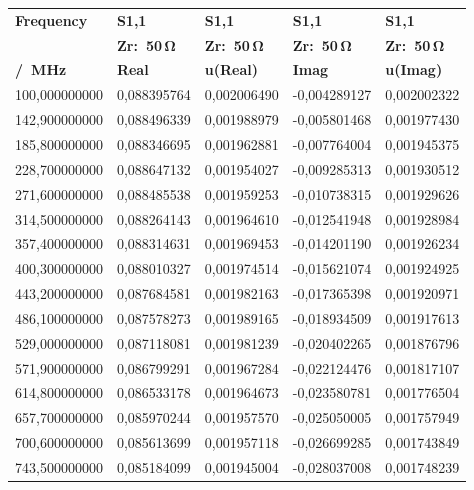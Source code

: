 \begin{longtable}{rrrrr}
\multicolumn{1}{l}{\textbf{Frequency}} & \multicolumn{1}{l}{\textbf{S1,1}} & \multicolumn{1}{l}{\textbf{S1,1}} & \multicolumn{1}{l}{\textbf{S1,1}} & \multicolumn{1}{l}{\textbf{S1,1}}\\
\multicolumn{1}{l}{\textbf{}} & \multicolumn{1}{l}{\textbf{Zr:~50\,$\mathbf{\Omega}$}} & \multicolumn{1}{l}{\textbf{Zr:~50\,$\mathbf{\Omega}$}} & \multicolumn{1}{l}{\textbf{Zr:~50\,$\mathbf{\Omega}$}} & \multicolumn{1}{l}{\textbf{Zr:~50\,$\mathbf{\Omega}$}}\\
\multicolumn{1}{l}{\textbf{/~MHz}} & \multicolumn{1}{l}{\textbf{Real}} & \multicolumn{1}{l}{\textbf{u(Real)}} & \multicolumn{1}{l}{\textbf{Imag}} & \multicolumn{1}{l}{\textbf{u(Imag)}}\\
\hline
\endhead
100,000000000 & 0,088395764 & 0,002006490 & -0,004289127 & 0,002002322\\
142,900000000 & 0,088496339 & 0,001988979 & -0,005801468 & 0,001977430\\
185,800000000 & 0,088346695 & 0,001962881 & -0,007764004 & 0,001945375\\
228,700000000 & 0,088647132 & 0,001954027 & -0,009285313 & 0,001930512\\
271,600000000 & 0,088485538 & 0,001959253 & -0,010738315 & 0,001929626\\
314,500000000 & 0,088264143 & 0,001964610 & -0,012541948 & 0,001928984\\
357,400000000 & 0,088314631 & 0,001969453 & -0,014201190 & 0,001926234\\
400,300000000 & 0,088010327 & 0,001974514 & -0,015621074 & 0,001924925\\
443,200000000 & 0,087684581 & 0,001982163 & -0,017365398 & 0,001920971\\
486,100000000 & 0,087578273 & 0,001989165 & -0,018934509 & 0,001917613\\
529,000000000 & 0,087118081 & 0,001981239 & -0,020402265 & 0,001876796\\
571,900000000 & 0,086799291 & 0,001967284 & -0,022124476 & 0,001817107\\
614,800000000 & 0,086533178 & 0,001964673 & -0,023580781 & 0,001776504\\
657,700000000 & 0,085970244 & 0,001957570 & -0,025050005 & 0,001757949\\
700,600000000 & 0,085613699 & 0,001957118 & -0,026699285 & 0,001743849\\
743,500000000 & 0,085184099 & 0,001945004 & -0,028037008 & 0,001748239\\

\end{longtable}
